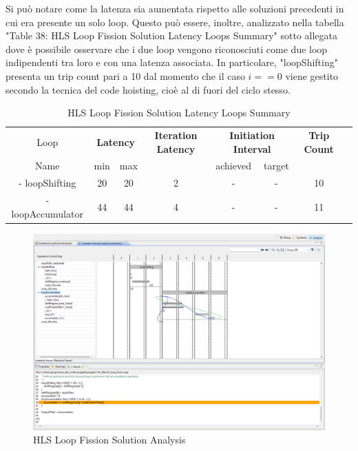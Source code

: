 Si può notare come la latenza sia aumentata rispetto alle soluzioni precedenti in cui era presente un solo loop. Questo può essere, inoltre, analizzato nella tabella "Table 38: HLS Loop Fission Solution Latency Loops Summary" sotto allegata dove è possibile osservare che i due loop vengono riconosciuti come due loop indipendenti tra loro e con una latenza associata. In particolare, "loopShifting" presenta un trip count pari a 10 dal momento che il caso $i==0$ viene gestito secondo la tecnica del code hoisting, cioè al di fuori del ciclo stesso.

\begin{table}[H]
    \centering
    \begin{tabular}{|c|c|c|c|c|c|c|c|}
        \hline
        \multicolumn{1}{|c|}{Loop} & \multicolumn{2}{|c|}{\textbf{Latency}} & \multicolumn{1}{c|}{\textbf{Iteration Latency}} & \multicolumn{2}{c|}{\textbf{Initiation Interval}} & \multicolumn{1}{c|}{\textbf{Trip Count}}  \\
        Name & min & max &  & achieved & target &  \\
        \hline
        - loopShifting & 20 & 20 & 2  & - & - & 10 \\
        - loopAccumulator & 44 & 44 & 4  & - & - & 11 \\
        \hline
    \end{tabular}
    \caption{HLS Loop Fission Solution Latency Loops Summary }
    \label{tab:hls-loop-fission-solution-loop-summary}
\end{table}

\begin{figure}[H]
    \centering
    \includegraphics[width=1\textwidth]{solutions/loop_fission/loopfissionanalysis.png}
    \caption{HLS Loop Fission Solution Analysis}
\end{figure}

